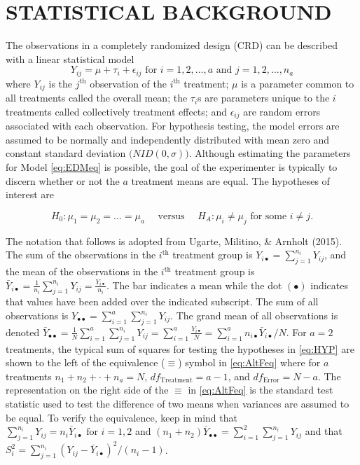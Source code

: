 \documentclass[
]{article}
\begin{document}
\hypertarget{statistical-background}{%
\section*{STATISTICAL BACKGROUND}\label{statistical-background}}

The observations in a completely randomized design (CRD) can be described with a linear statistical model
\begin{equation}
Y_{ij} = \mu + \tau_i + \epsilon_{ij} \text{ for }i=1, 2, \dots, a \text{ and } j
=1, 2, \dots, n_a
\label{eq:EDMeq}
\end{equation}
where \(Y_{ij}\) is the \(j^\text{th}\)
observation of the \(i^\text{th}\) treatment; \(\mu\) is a parameter common to all treatments called the overall mean; the \(\tau_i\)s are parameters unique to the \(i\) treatments called collectively treatment effects; and \(\epsilon_{ij}\) are random errors associated with each observation. For hypothesis testing, the model errors are assumed to be normally and independently distributed with mean zero and constant standard deviation \(\bigl(NID(0, \sigma)\bigr)\). Although estimating the parameters for Model \eqref{eq:EDMeq} is possible, the goal of the experimenter is typically to discern whether or not the \(a\) treatment means are equal. The hypotheses of interest are

\begin{equation}
H_0: \mu_1=\mu_2= \dots = \mu_a\quad\text{ versus }\quad H_A:\mu_i \ne \mu_j \text{ for some }i \neq j.
\label{eq:HYP}
\end{equation}

The notation that follows is adopted from Ugarte, Militino, \& Arnholt (2015). The sum of the observations in the \(i^\text{th}\) treatment group is \(Y_{i\bullet}=\sum_{j=1}^{n_i} Y_{ij}\), and the mean of the observations in the \(i^\text{th}\) treatment group is \(\bar{Y}_{i\bullet}=\frac{1}{n_{i}}\sum_{j=1}^{n_i} Y_{ij} = \frac{Y_{i\bullet}}{n_i}\). The bar indicates a mean while the dot \((\bullet)\) indicates that values have been added over the indicated subscript. The sum of all observations is \(Y_{\bullet\bullet}=\sum_{i=1}^a \sum_{j=1}^{n_i}Y_{ij}.\) The grand mean of all observations is denoted \(\bar{Y}_{\bullet\bullet}=\frac{1}{N}\sum_{i=1}^a \sum_{j=1}^{n_i}Y_{ij}=\sum_{i=1}^{a}\frac{Y_{i\bullet}}{N} =\sum_{i=1}^{a}n_{i\bullet}\bar{Y}_{i\bullet}/N.\) For \(a = 2\) treatments, the typical sum of squares for testing the hypotheses in \eqref{eq:HYP} are shown to the left of the equivalence (\(\equiv\)) symbol in \eqref{eq:AltFeq} where for \(a\) treatments \(n_1 + n_2 + \cdot + n_a = N\), \(df_{\text{Treatment}} = a - 1\), and \(df_{\text{Error}} = N-a\). The representation on the right side of the \(\equiv\) in \eqref{eq:AltFeq} is the standard test statistic used to test the difference of two means when variances are assumed to be equal. To verify the equivalence, keep in mind that \(\sum_{j=1}^{n_i} Y_{ij} = n_i \bar{Y}_{i\bullet} \text{ for } i=1,2\) and \((n_1 + n_2) \bar{Y}_{\bullet\bullet} = \sum_{i=1}^2 \sum_{j=1}^{n_i} Y_{ij}\) and that \(S_i^2 =\sum_{j=1}^{n_i}(Y_{ij} - \bar{Y}_{i\bullet})^2/(n_i - 1)\).
\end{document}
